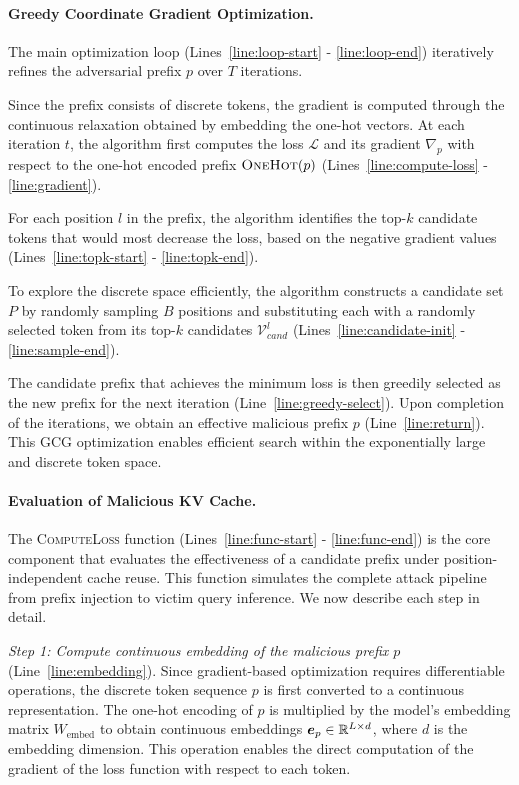 \paragraph{Greedy Coordinate Gradient Optimization.}
The main optimization loop (Lines~\ref{line:loop-start} - \ref{line:loop-end}) iteratively refines the adversarial prefix $p$ over $T$ iterations. 

Since the prefix consists of discrete tokens, the gradient is computed through the continuous relaxation obtained by embedding the one-hot vectors. At each iteration $t$, the algorithm first computes the loss $\mathcal{L}$ and its gradient $\nabla_p$ with respect to the one-hot encoded prefix $\textsc{OneHot}(p)$ (Lines~\ref{line:compute-loss} - \ref{line:gradient}). 

For each position $l$ in the prefix, the algorithm identifies the top-$k$ candidate tokens that would most decrease the loss, based on the negative gradient values (Lines~\ref{line:topk-start} - \ref{line:topk-end}). 

To explore the discrete space efficiently, the algorithm constructs a candidate set $P$ by randomly sampling $B$ positions and substituting each with a randomly selected token from its top-$k$ candidates $\mathcal{V}_{cand}^l$ (Lines~\ref{line:candidate-init} - \ref{line:sample-end}). 

The candidate prefix that achieves the minimum loss is then greedily selected as the new prefix for the next iteration (Line~\ref{line:greedy-select}). 
% 
Upon completion of the iterations, we obtain an effective malicious prefix $p$ (Line~\ref{line:return}). This GCG optimization enables efficient search within the exponentially large and discrete token space.


\paragraph{Evaluation of Malicious KV Cache.}
The \textsc{ComputeLoss} function (Lines~\ref{line:func-start} - \ref{line:func-end}) is the core component that evaluates the effectiveness of a candidate prefix under position-independent cache reuse. This function simulates the complete attack pipeline from prefix injection to victim query inference. We now describe each step in detail.

\textit{Step 1: Compute continuous embedding of the malicious prefix $p$} (Line~\ref{line:embedding}). Since gradient-based optimization requires differentiable operations, the discrete token sequence $p$ is first converted to a continuous representation. The one-hot encoding of $p$ is multiplied by the model's embedding matrix $W_{\text{embed}}$ to obtain continuous embeddings $\bm{e}_p \in \mathbb{R}^{L \times d}$, where $d$ is the embedding dimension. This operation enables the direct computation of the gradient of the loss function with respect to each token.


